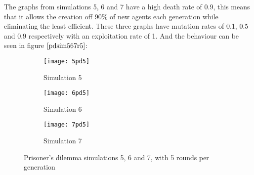 The graphs from simulations 5, 6 and 7  have a high death rate of 0.9, this means that it allows the creation off 90\% of new agents each generation while eliminating the least efficient. These three graphs have mutation rates of 0.1, 0.5 and 0.9 respectively with an exploitation rate of 1. And the behaviour can be seen  in figure $\ref{pdsim567r5}$:

\begin{figure}[H]       
    \centering
    \begin{subfigure}[b]{0.3\textwidth}
	\centering
	{\texttt{[image: 5pd5]}}   
    	\caption{Simulation 5}
	\label{fig:pds5}
    \end{subfigure}
    \hfill
    \begin{subfigure}[b]{0.3\textwidth}
	\centering
	{\texttt{[image: 6pd5]}}   
    	\caption{Simulation 6}
	\label{fig:pds6}
    \end{subfigure}
    \hfill
    \begin{subfigure}[b]{0.3\textwidth}
	\centering
	{\texttt{[image: 7pd5]}}   
    	\caption{Simulation 7}
	\label{fig:pds7}
    \end{subfigure}
    \caption{Prisoner's dilemma simulations 5, 6 and 7, with 5 rounds per generation}
    \label{pdsim567r5}
\end{figure}

